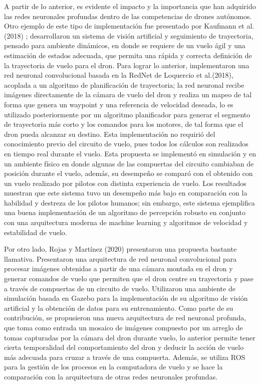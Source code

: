 A partir de lo anterior, es evidente el impacto y la importancia que han adquirido las redes neuronales profundas dentro de las competencias de drones autónomos. Otro ejemplo de este tipo de implementación fue presentado por Kaufmann et al. (2018) \cite{kaufmann2018deep};  desarrollaron un sistema de visión artificial y seguimiento de trayectoria, pensado para ambiente dinámicos, en donde se requiere de un vuelo ágil y una estimación de estados adecuada, que permita una rápida y correcta definición de la trayectoria de vuelo para el dron. 
Para lograr lo anterior, implementaron una red neuronal convolucional basada en la RedNet de Loquercio et al.(2018)\cite{loquercio2018dronet}, acoplada a un algoritmo de planificación de trayectoria; la red neuronal recibe imágenes directamente de la cámara de vuelo del dron y realiza un mapeo de tal forma que genera un waypoint y una referencia de velocidad deseada, lo es utilizado posteriormente por un algoritmo planificador para generar el segmento de trayectoria más corto y los comandos para los motores, de tal forma que el dron pueda alcanzar su destino. Esta implementación no requirió del conocimiento previo del circuito de vuelo, pues todos los cálculos son realizados en tiempo real durante el vuelo. Esta propuesta se implementó en simulación y en un ambiente físico en donde algunas de las compuertas del circuito cambiaban de posición durante el vuelo, además, su desempeño se comparó con el obtenido con un vuelo realizado por pilotos con distinta experiencia de vuelo. Los resultados muestran que este sistema tuvo un desempeño más bajo en comparación con la habilidad y destreza de los pilotos humanos; sin embargo, este sistema ejemplifica una buena implementación de un algoritmo de percepción robusto en conjunto con una arquitectura moderna de machine learning y algoritmos de velocidad y estabilidad de vuelo. 

Por otro lado, Rojas y Martínez (2020)\cite{rojas2020deeppilot} presentaron una propuesta bastante llamativa. Presentaron una arquitectura de red neuronal convolucional para procesar imágenes obtenidas a partir de una cámara montada en el dron y generar comandos de vuelo que permiten que el dron centre su trayectoria y pase a través de compuertas de un circuito de vuelo. Utilizaron una ambiente de simulación basada en Gazebo para la implementación de su algoritmo de visión artificial y la obtención de datos para su entrenamiento. Como parte de su contribución, se propusieron una nueva arquitectura de red neuronal profunda, que toma como entrada un mosaico de imágenes compuesto por un arreglo de tomas capturadas por la cámara del dron durante vuelo, lo anterior permite tener cierta temporalidad del comportamiento del dron y deducir la acción de vuelo más adecuada para cruzar a través de una compuerta.
Además, se utiliza ROS para la gestión de los procesos en la computadora de vuelo y se hace la comparación con la arquitectura de otras redes neuronales profundas.

